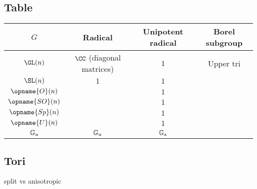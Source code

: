 \subsection{Table}
\begin{center}
  \begin{tabular}[h]{cccc}
    \toprule
    $G$ & Radical & Unipotent radical & Borel subgroup \\ \midrule
    $\GL(n)$ & $\CC$ (diagonal matrices) & $1$ & Upper tri \\
    $\SL(n)$ & $1$ & $1$ \\
    $\opname{O}(n)$ & & $1$ \\
    $\opname{SO}(n)$ & & $1$ \\
    $\opname{Sp}(n)$ & & $1$ \\
    $\opname{U}(n)$ & & $1$ \\
    $\mathbb{G}_{\mathrm{a}}$ & $\mathbb{G}_{\mathrm{a}}$ & $\mathbb{G}_{\mathrm{a}}$ & \\\bottomrule
  \end{tabular}
\end{center}

\subsection{Tori}

split vs anisotropic
